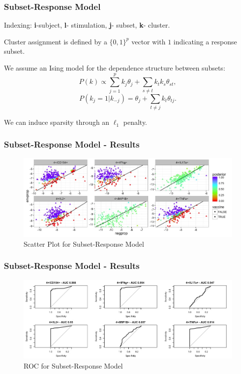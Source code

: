 \documentclass{beamer}
\theoremstyle{definition}
\begin{document}
\begin{frame}
\frametitle{Subset-Response Model}
\begin{framed}
Indexing: \textbf{i}-subject, \textbf{l}- stimulation, \textbf{j}- subset, \textbf{k}- cluster.
\end{framed}

Cluster assignment is defined by a $\{0,1\}^{p}$ vector with $1$ indicating a response subset.
\pause
\vspace{0.3 cm}

We assume an Ising model for the dependence structure between subsets:
$$
P(k) \propto \sum_{j=1}^{p} k_{j} \theta_j + \sum_{s\neq t} k_{t} k_{s} \theta_{st},
$$$$
P(k_{j} = 1| k_{-j}) = \theta_{j} + \sum_{t\neq j } k_{t} \theta_{tj}.
$$

\pause
\vspace{0.3 cm}
We can induce sparsity through an $\ell_1$ penalty.

\end{frame}


\begin{frame}
\frametitle{Subset-Response Model - Results}
\begin{figure}[]
\includegraphics[width=12 cm]{figures/subsetBinomialScatter} \caption{Scatter Plot for Subset-Response Model}
\end{figure}
\end{frame}

\begin{frame}
\frametitle{Subset-Response Model - Results}
\begin{figure}[]
\includegraphics[width=12 cm]{figures/subsetBinomialAUC} \caption{ROC for Subset-Response Model}
\end{figure}
\end{frame}
\end{document}

